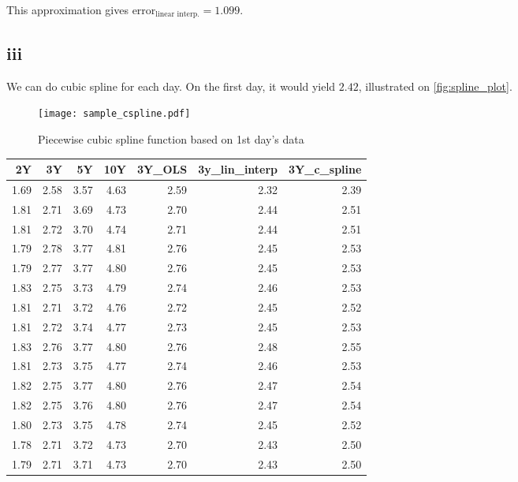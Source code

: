 \documentclass{article}
\begin{document}
This approximation gives $\text{error}_{\text{linear interp.}} = 1.099$.
\subsection*{iii}
We can do cubic spline for each day. On the first day, it would yield $2.42$, illustrated on \autoref{fig:spline_plot}.
\begin{figure}[h]
    \centering
    \texttt{[image: sample\_cspline.pdf]}
    \caption{Piecewise cubic spline function based on 1st day's data}
    \label{fig:spline_plot}
\end{figure}

\begin{tabular}{rrrrrrr}
    \toprule
    2Y   & 3Y   & 5Y   & 10Y  & 3Y\_OLS & 3y\_lin\_interp & 3Y\_c\_spline \\
    \midrule
    1.69 & 2.58 & 3.57 & 4.63 & 2.59    & 2.32            & 2.39          \\
    1.81 & 2.71 & 3.69 & 4.73 & 2.70    & 2.44            & 2.51          \\
    1.81 & 2.72 & 3.70 & 4.74 & 2.71    & 2.44            & 2.51          \\
    1.79 & 2.78 & 3.77 & 4.81 & 2.76    & 2.45            & 2.53          \\
    1.79 & 2.77 & 3.77 & 4.80 & 2.76    & 2.45            & 2.53          \\
    1.83 & 2.75 & 3.73 & 4.79 & 2.74    & 2.46            & 2.53          \\
    1.81 & 2.71 & 3.72 & 4.76 & 2.72    & 2.45            & 2.52          \\
    1.81 & 2.72 & 3.74 & 4.77 & 2.73    & 2.45            & 2.53          \\
    1.83 & 2.76 & 3.77 & 4.80 & 2.76    & 2.48            & 2.55          \\
    1.81 & 2.73 & 3.75 & 4.77 & 2.74    & 2.46            & 2.53          \\
    1.82 & 2.75 & 3.77 & 4.80 & 2.76    & 2.47            & 2.54          \\
    1.82 & 2.75 & 3.76 & 4.80 & 2.76    & 2.47            & 2.54          \\
    1.80 & 2.73 & 3.75 & 4.78 & 2.74    & 2.45            & 2.52          \\
    1.78 & 2.71 & 3.72 & 4.73 & 2.70    & 2.43            & 2.50          \\
    1.79 & 2.71 & 3.71 & 4.73 & 2.70    & 2.43            & 2.50          \\
    \bottomrule
\end{tabular}
\end{document}
